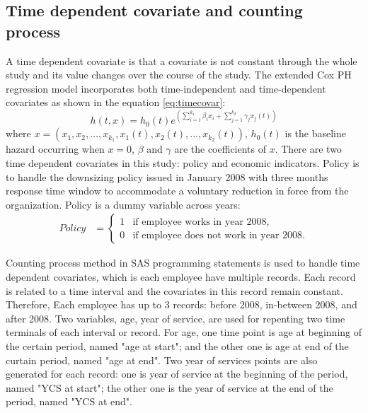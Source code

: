 \documentclass[12pt,letterpaper]{article}
\begin{document}
\subsection{Time dependent covariate and counting process}
\label{sec:coxt}
A time dependent covariate is that a covariate is not constant through the whole study and its value changes over the course of the study. The extended Cox PH regression model incorporates both time-independent and time-dependent covariates as shown in the equation \ref{eq:timecovar}:
\begin{equation}
\label{eq:timecovar}
h(t,x)=h_0(t)e^{(\sum_{i=1}^{k_1}\beta_ix_i+\sum_{j=1}^{k_2}\gamma_jx_j(t))}
\end{equation}
where $x=(x_1, x_2, \ldots, x_{k_1}, x_1(t), x_2(t), \ldots, x_{k_2}(t))$, $h_0(t)$ is the baseline hazard occurring when $x=0$, $\beta$ and $\gamma$ are the coefficients of $x$.
There are two time dependent covariates in this study: policy and economic indicators. Policy is to handle the downsizing policy issued in January 2008 with three months response time window to accommodate a voluntary reduction in force from the organization. Policy is a dummy variable across years:
\begin{align*}
Policy&=
\begin{cases}
1   &\text{if employee works in year 2008,}\\
0   &\text{if  employee does not work in year 2008.}
\end{cases}
\end{align*}

Counting process method in SAS programming statements is used to handle time dependent covariates, which is each employee have multiple records. Each record is related to a time interval and the covariates in this record remain constant.
Therefore, Each employee has up to 3 records: before 2008, in-between 2008, and after 2008. Two variables, age, year of service, are used for repenting two time terminals of each interval or record. For age, one time point is age at beginning of the certain period, named "age at start"; and the other one is age at end of the curtain period, named "age at end".
    Two year of services points are also generated for each record: one is year of service at the beginning of the period, named "YCS at start"; the other one is the year of service at the end of the period, named "YCS at end".\\
\end{document}

